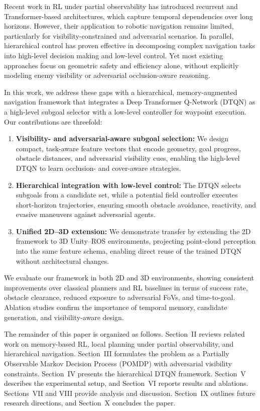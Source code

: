 \documentclass[letterpaper, 10 pt, conference]{ieeeconf}
\begin{document}
Recent work in RL under partial observability has introduced recurrent and Transformer-based architectures, which capture temporal dependencies over long horizons. However, their application to robotic navigation remains limited, particularly for visibility-constrained and adversarial scenarios. In parallel, hierarchical control has proven effective in decomposing complex navigation tasks into high-level decision making and low-level control. Yet most existing approaches focus on geometric safety and efficiency alone, without explicitly modeling enemy visibility or adversarial occlusion-aware reasoning.

In this work, we address these gaps with a hierarchical, memory-augmented navigation framework that integrates a Deep Transformer Q-Network (DTQN) as a high-level subgoal selector with a low-level controller for waypoint execution. Our contributions are threefold:
\begin{enumerate}
    \item \textbf{Visibility- and adversarial-aware subgoal selection:} We design compact, task-aware feature vectors that encode geometry, goal progress, obstacle distances, and adversarial visibility cues, enabling the high-level DTQN to learn occlusion- and cover-aware strategies.
    \item \textbf{Hierarchical integration with low-level control:} The DTQN selects subgoals from a candidate set, while a potential field controller executes short-horizon trajectories, ensuring smooth obstacle avoidance, reactivity, and evasive maneuvers against adversarial agents.
    \item \textbf{Unified 2D--3D extension:} We demonstrate transfer by extending the 2D framework to 3D Unity--ROS environments, projecting point-cloud perception into the same feature schema, enabling direct reuse of the trained DTQN without architectural changes.
\end{enumerate}

We evaluate our framework in both 2D and 3D environments, showing consistent improvements over classical planners and RL baselines in terms of success rate, obstacle clearance, reduced exposure to adversarial FoVs, and time-to-goal. Ablation studies confirm the importance of temporal memory, candidate generation, and visibility-aware design.

The remainder of this paper is organized as follows. Section~II reviews related work on memory-based RL, local planning under partial observability, and hierarchical navigation. Section~III formulates the problem as a Partially Observable Markov Decision Process (POMDP) with adversarial visibility constraints. Section~IV presents the hierarchical DTQN framework. Section~V describes the experimental setup, and Section~VI reports results and ablations. Sections~VII and VIII provide analysis and discussion. Section~IX outlines future research directions, and Section~X concludes the paper.
\end{document}
